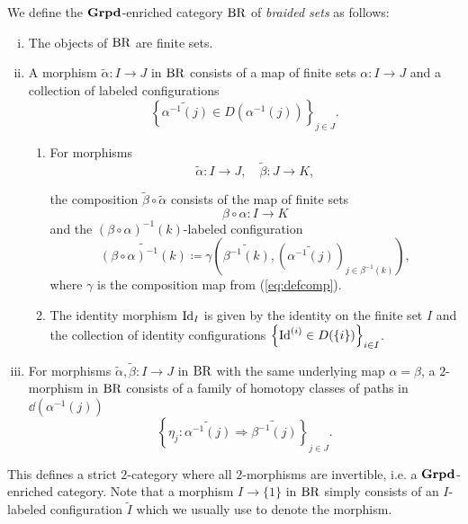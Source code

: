 \begin{defin}
    We define the $\operatorname{\textbf{Grpd}}$-enriched category $\operatorname{BR}$ of {\em braided sets} as
    follows:
    \begin{enumerate}[(i)]
        \item The objects of $\operatorname{BR}$ are finite sets.
        \item A morphism $\widetilde{\alpha} \colon I \to J$ in $\operatorname{BR}$ consists
        of a map of finite sets  $\alpha \colon I \to J$ and a collection of
        labeled configurations
        \[
            \left\{\widetilde{\alpha^{-1}(j)} \in D(\alpha^{-1}(j))\right\}_{j \in J}.
        \]

        \begin{enumerate}
            \item For morphisms
        \[
            \widetilde{\alpha} \colon I \to J, \quad \widetilde{\beta} \colon J \to K,
        \]
        
        the composition $\widetilde{\beta} \circ \widetilde{\alpha}$ consists of
        the map of finite sets
        \[
            \beta \circ \alpha \colon I \to K
        \]
        and the $(\beta \circ \alpha)^{-1}(k)$-labeled configuration
        \[
            \widetilde{(\beta \circ \alpha)^{-1}(k)} \coloneqq \gamma\left(\widetilde{\beta^{-1}(k)}, (\widetilde{\alpha^{-1}(j)})_{j \in \beta^{-1}(k)}\right),%
        \]
        where $\gamma$ is the composition map from (\ref{eq:defcomp}).
        
        \item The identity morphism $\operatorname{Id}_I$ is given by the identity on the
        finite set $I$ and the collection of identity configurations
        $\left\{\operatorname{Id}^{(i)} \in D(\{i\})\right\}_{i \in I}$.
        \end{enumerate}
        \item For morphisms $\widetilde{\alpha}, \widetilde{\beta} \colon I \to
        J$ in $\operatorname{BR}$ with the same underlying map $\alpha = \beta$, a
        $2$-morphism in $\operatorname{BR}$ consists of a family of homotopy classes of paths
        in $\dd(\alpha^{-1}(j))$
        \[
            \left\{\eta_j \colon \widetilde{\alpha^{-1}(j)} \Rightarrow \widetilde{\beta^{-1}(j)}\right\}_{j \in J}.
        \]
    \end{enumerate}
\end{defin}
This defines a strict $2$-category where all $2$-morphisms are invertible, i.e.
a $\operatorname{\textbf{Grpd}}$-enriched category. Note that a morphism $I \to \{1\}$ in $\operatorname{BR}$ simply
consists of an $I$-labeled configuration $\widetilde{I}$ which we usually use to
denote the morphism. 

